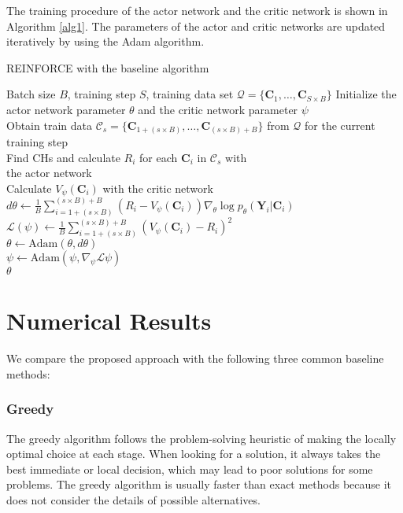 \documentclass[journal]{IEEEtran}
\begin{document}
	The training procedure of the actor network and the critic network is shown in Algorithm \ref{alg1}. The parameters of the actor and critic networks are updated iteratively by using the Adam algorithm\cite{D. P. Kingma}.
	
	
	\begin{algorithm}[t!]
	\caption{{REINFORCE with the baseline algorithm}}
	\label{alg1}
	\begin{algorithmic}[1]
		\renewcommand{\algorithmicrequire}{\textbf{Input:}}
		\REQUIRE  Batch size $B$, training step $S$, training data set $\bm{\mathcal{Q}} = \{\bm{C}_1,\dots, \bm{C}_{S\times B}\}$
	    \STATE Initialize the actor network parameter $\theta$ and the critic network parameter $\psi$\\
	         \STATE Obtain train data $\bm{\mathcal{C}}_s = \{\bm{C}_{1+(s\times B)}, \dots, \bm{C}_{(s\times B) +B}\}$  from $\bm{\mathcal{Q}}$ for the current training step\\
	         \STATE Find CHs and calculate $R_i$ for each $\bm{C}_i$ in $\bm{\mathcal{C}}_s$ with \\the actor network\\
	         \STATE Calculate $V_{\psi}\left(\bm{C}_i \right)$ with the critic network\\
		    \STATE $d\theta \gets \frac{1}{B} \displaystyle \sum_{i=1+(s\times B)}^{(s\times B)+B} \left( R_i-V_{\psi}\left(\bm{C}_i\right) \right) \nabla_{\theta} \log p_{\theta} \left(\bm{Y}_i|\bm{C}_i\right)$ \\
		    \STATE $\mathcal{L}(\psi) \gets \frac{1}{B}\displaystyle \sum_{i=1+(s\times B)}^{(s\times B)+B}\left(V_{\psi}\left(\bm{C}_i \right) - R_i\right)^2$ \\
		    \STATE $\theta \gets \text{Adam}\left(\theta, d\theta\right)$ \\
		    \STATE $\psi \gets \text{Adam}\left(\psi, \nabla_{\psi}\mathcal{L}\psi\right)$ \\
		\ENDFOR
		\RETURN $\theta$\\
	\end{algorithmic}
    \end{algorithm}

\section{Numerical Results}\label{SecVI}

We compare the proposed approach with the following three common baseline methods:
\subsubsection{Greedy}
The greedy algorithm follows the problem-solving heuristic of making the locally optimal choice at each stage\cite{T.H. Cormen}. When looking for a solution, it always takes the best immediate or local decision, which may lead to poor solutions for some problems. The greedy algorithm is usually faster than exact methods because it does not consider the details of possible alternatives.
\end{document}
